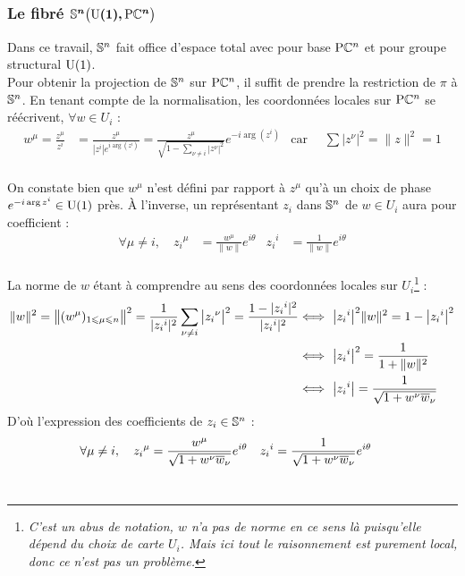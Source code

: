 \subsubsection{Le fibré $\bf{\VFP}$}\label{subsec:SUPC_VFP}

Dans ce travail, $\S{n}$ fait office d'espace total avec pour base $\PC{n}$ et pour groupe structural $\U{1}$.
\\
Pour obtenir la projection de $\S{n}$ sur $\PC{n}$, il suffit de prendre la restriction de $\pi$ à $\S{n}$. En tenant compte de la normalisation, les coordonnées locales sur $\PC{n}$ se réécrivent, $\forall w\in U_i$ :
\begin{align*}
	w^\mu = \frac{z^\mu}{z^i} &= \frac{z^\mu}{|z^i|e^{i\arg (z^i)}} = \frac{z^{\mu}}{\sqrt{1 - \sum_{\nu \neq i} |z^\nu|^2}} e^{-i\arg(z^i)}  &  \text{car }\quad \sum \big|z^\nu\big|^2 = \|z\|^2 = 1
\end{align*}
\\
On constate bien que $w^\mu$ n'est défini par rapport à $z^\mu$ qu'à un choix de phase $e^{-i\arg z^i}\in \U{1}$ près. À l'inverse, un représentant $z_i$ dans $\S{n}$ de $w\in U_i$ aura pour coefficient :
\begin{align*}
	\forall \mu\neq i,\quad {z_i}^\mu &= \frac{w^\mu}{\|w\|}e^{i\theta}  &  {z_i}^i &= \frac{1}{\|w\|}e^{i\theta} 
\end{align*}
\\
La norme de $w$ étant à comprendre au sens des coordonnées locales sur $U_i$\footnote{\itshape
	C'est un abus de notation, $w$ n'a pas de norme en ce sens là puisqu'elle dépend du choix de carte $U_i$. Mais ici tout le raisonnement est purement local, donc ce n'est pas un problème.
} :
\begin{align*}
	\|w\|^2 = \big\|(w^\mu)_{1\leq \mu\leq n}\big\|^2 = \frac{1}{|{z_i}^i|^2}\sum_{\nu \neq i} \big|{z_i}^\nu\big|^2 = \frac{1 - |{z_i}^i|^2}{|{z_i}^i|^2} &\Llr\ \big| {z_i}^i \big|^2 \|w\|^2 = 1 - \big|{z_i}^i\big|^2 \\
	&\Llr\ \big|{z_i}^i\big|^2 = \frac{1}{1 + \|w\|^2} \\
	&\Llr\ \big|{z_i}^i\big| = \frac{1}{\sqrt{1 + w^\nu \congu{w}_\nu}}
\end{align*}
D'où l'expression des coefficients de $z_i\in\S{n}$ :
\begin{align*}
	 \forall \mu\neq i,\quad {z_i}^\mu &= \frac{w^\mu}{\sqrt{1 + w^\nu \congu{w}_\nu}}e^{i\theta}  &  {z_i}^i &= \frac{1}{\sqrt{1 + w^\nu \congu{w}_\nu}}e^{i\theta} 
\end{align*}
\\

